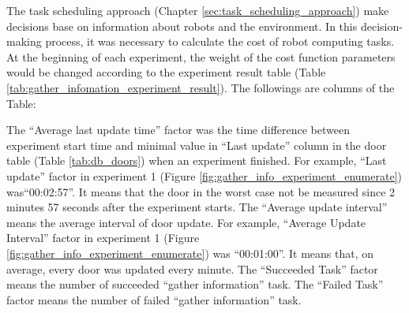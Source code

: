 \begin{table}[]
\caption{Example result of gather information experiment. The values of the first three columns (weight parameters) were set before the simulation experiment was started, and the values of other columns were filled after the simulation experiment.}
\label{tab:gather_infomation_experiment_result}
\end{table}

The task scheduling approach (Chapter \ref{sec:task_scheduling_approach}) make decisions base on information about robots and the environment. In this decision-making process, it was necessary to calculate the cost of robot computing tasks. At the beginning of each experiment, the weight of the cost function parameters would be changed according to the experiment result table (Table \ref{tab:gather_infomation_experiment_result}). The followings are columns of the Table:

The ``Average last update time'' factor was the time difference between experiment start time and minimal value in ``Last update'' column in the door table (Table \ref{tab:db_doors}) when an experiment finished. For example, ``Last update'' factor in experiment 1 (Figure \ref{fig:gather_info_experiment_enumerate}) was``00:02:57''. It means that the door in the worst case not be measured since 2 minutes 57 seconds after the experiment starts. The ``Average update interval'' means the average interval of door update. For example, ``Average Update Interval'' factor in experiment 1 (Figure \ref{fig:gather_info_experiment_enumerate}) was ``00:01:00''. It means that, on average, every door was updated every minute. The ``Succeeded Task'' factor means the number of succeeded ``gather information'' task. The ``Failed Task'' factor means the number of failed ``gather information'' task.



